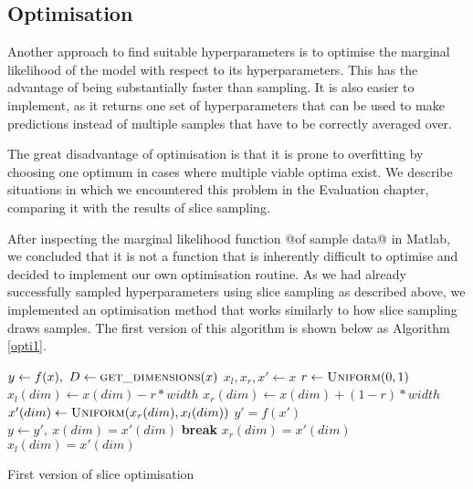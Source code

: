 \documentclass[a4paper,12pt,twoside,openright]{report}
\newcommand{\Break}{\State \textbf{break} }
\begin{document}
\subsection{Optimisation}
Another approach to find suitable hyperparameters is to optimise the marginal likelihood of the model with respect to its hyperparameters. This has the advantage of being substantially faster than sampling. It is also easier to implement, as it returns one set of hyperparameters that can be used to make predictions instead of multiple samples that have to be correctly averaged over.

The great disadvantage of optimisation is that it is prone to overfitting by choosing one optimum in cases where multiple viable optima exist. We describe situations in which we encountered this problem in the Evaluation chapter, comparing it with the results of slice sampling.



After inspecting the marginal likelihood function @of sample data@ in Matlab, we concluded that it is not a function that is inherently difficult to optimise and decided to implement our own optimisation routine. As we had already successfully sampled hyperparameters using slice sampling as described above, we implemented an optimisation method that works similarly to how slice sampling draws samples. The first version of this algorithm is shown below as Algorithm \ref{opti1}.


\begin{algorithm}
\begin{algorithmic}[1]
\State $y\gets f(x),\ D\gets \Call{get\_dimensions}{x}$
\State $x_l, x_r, x'\gets x$
\State $r\gets \Call{Uniform}{0, 1}$
\State $x_l(dim)\gets x(dim) - r * width$
\State $x_r(dim)\gets x(dim) + (1 - r) * width$
\State $x'(dim)\gets \Call{Uniform}{x_r(dim), x_l(dim)}$
\State $y' = f(x')$
\State $y\gets y',\ x(dim) = x'(dim)$
\Break
\EndIf
{}
\State $x_r(dim) = x'(dim)$
\State $x_l(dim) = x'(dim)$
\EndIf
\EndFor
\EndFor
\EndFor
\EndProcedure
\end{algorithmic}
\caption{First version of slice optimisation}
\label{opti1}
\end{algorithm}
\end{document}
